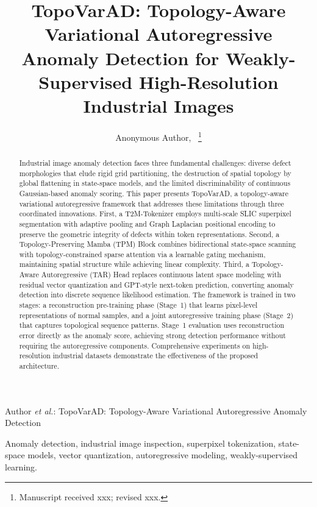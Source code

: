 \documentclass[lettersize,journal]{IEEEtran}
\begin{document}
\title{TopoVarAD: Topology-Aware Variational Autoregressive Anomaly Detection for Weakly-Supervised High-Resolution Industrial Images}

\author{Anonymous Author,~
\thanks{Manuscript received xxx; revised xxx.}}

%
{Author \MakeLowercase{\textit{et al.}}: TopoVarAD: Topology-Aware Variational Autoregressive Anomaly Detection}

\maketitle

\begin{abstract}
Industrial image anomaly detection faces three fundamental challenges: diverse defect morphologies that elude rigid grid partitioning, the destruction of spatial topology by global flattening in state-space models, and the limited discriminability of continuous Gaussian-based anomaly scoring. This paper presents TopoVarAD, a topology-aware variational autoregressive framework that addresses these limitations through three coordinated innovations. First, a T2M-Tokenizer employs multi-scale SLIC superpixel segmentation with adaptive pooling and Graph Laplacian positional encoding to preserve the geometric integrity of defects within token representations. Second, a Topology-Preserving Mamba (TPM) Block combines bidirectional state-space scanning with topology-constrained sparse attention via a learnable gating mechanism, maintaining spatial structure while achieving linear complexity. Third, a Topology-Aware Autoregressive (TAR) Head replaces continuous latent space modeling with residual vector quantization and GPT-style next-token prediction, converting anomaly detection into discrete sequence likelihood estimation. The framework is trained in two stages: a reconstruction pre-training phase (Stage~1) that learns pixel-level representations of normal samples, and a joint autoregressive training phase (Stage~2) that captures topological sequence patterns. Stage~1 evaluation uses reconstruction error directly as the anomaly score, achieving strong detection performance without requiring the autoregressive components. Comprehensive experiments on high-resolution industrial datasets demonstrate the effectiveness of the proposed architecture.
\end{abstract}

\begin{IEEEkeywords}
Anomaly detection, industrial image inspection, superpixel tokenization, state-space models, vector quantization, autoregressive modeling, weakly-supervised learning.
\end{IEEEkeywords}
\end{document}
